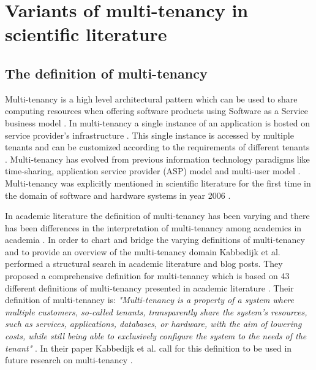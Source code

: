 \documentclass[conference]{sasmoota2017}
\begin{document}
\section{Variants of multi-tenancy in scientific literature}

\subsection{The definition of multi-tenancy}


Multi-tenancy is a high level architectural pattern which can be used to share computing resources when offering software products using Software as a Service business model \cite{Kabbedijk2015:Defining}. In multi-tenancy a single instance of an application is hosted on service provider's infrastructure \cite{Kabbedijk2015:Defining}. This single instance is accessed by multiple tenants and can be customized according to the requirements of different tenants \cite{Kabbedijk2015:Defining}. Multi-tenancy has evolved from previous information technology paradigms like time-sharing, application service provider (ASP) model and multi-user model \cite{Kabbedijk2015:Defining}. Multi-tenancy was explicitly mentioned in scientific literature for the first time in the domain of software and hardware systems in year 2006 \cite{Kabbedijk2015:Defining, Carraro:2006:ArchitectureLongTail}. 

In academic literature the definition of multi-tenancy has been varying and there has been differences in the interpretation of multi-tenancy among academics in academia \cite{Kabbedijk2015:Defining}. In order to chart and bridge the varying definitions of multi-tenancy and to provide an overview of the multi-tenancy domain Kabbedijk et al. \cite{Kabbedijk2015:Defining} performed a structural search in academic literature and blog posts. They proposed a comprehensive definition for multi-tenancy which is based on 43 different definitions of multi-tenancy presented in academic literature \cite{Kabbedijk2015:Defining}. Their definition of multi-tenancy is: \textit{"Multi-tenancy is a property of a system where multiple customers, so-called tenants, transparently share the system's resources, such as services, applications, databases, or hardware, with the aim of lowering costs, while still being able to exclusively configure the system to the needs of the tenant"} \cite{Kabbedijk2015:Defining}. In their paper Kabbedijk et al. call for this definition to be used in future research on multi-tenancy \cite{Kabbedijk2015:Defining}.
\end{document}
